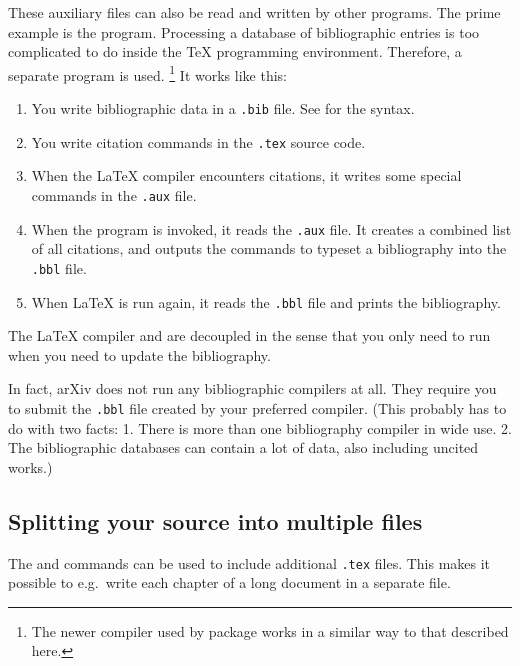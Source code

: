 These auxiliary files can also be read and written by other programs.
The prime example is the  program.\label{bibtex process}
Processing a database of bibliographic entries is too complicated to do
inside the \TeX{} programming environment.
Therefore, a separate program is used.%
\footnote{The newer  compiler used by  package works
in a similar way to that described here.}
It works like this:
\begin{enumerate}
\item You write bibliographic data in a \verb|.bib| file.
    See  for the syntax.
\item You write citation commands in the \verb|.tex| source code.
\item When the \LaTeX{} compiler encounters citations,
    it writes some special commands in the \verb|.aux| file.
\item When the  program is invoked, it reads the \verb|.aux| file.
    It creates a combined list of all citations,
    and outputs the commands to typeset a bibliography into the \verb|.bbl| file.
\item When \LaTeX{} is run again,
    it reads the \verb|.bbl| file and prints the bibliography.
\end{enumerate}
%
The \LaTeX{} compiler and  are decoupled in the sense that
you only need to run  when you need to update the bibliography.

In fact, arXiv does not run any bibliographic compilers at all.
They require you to submit the \verb|.bbl| file created by your preferred compiler.
(This probably has to do with two facts:
1. There is more than one bibliography compiler in wide use.
2. The bibliographic databases can contain a lot of data,
also including uncited works.)



%
%
\subsection{Splitting your source into multiple files}

The  and  commands can be used to include additional \verb|.tex| files.
This makes it possible to e.g.\ write each chapter of a long document in a separate file.

